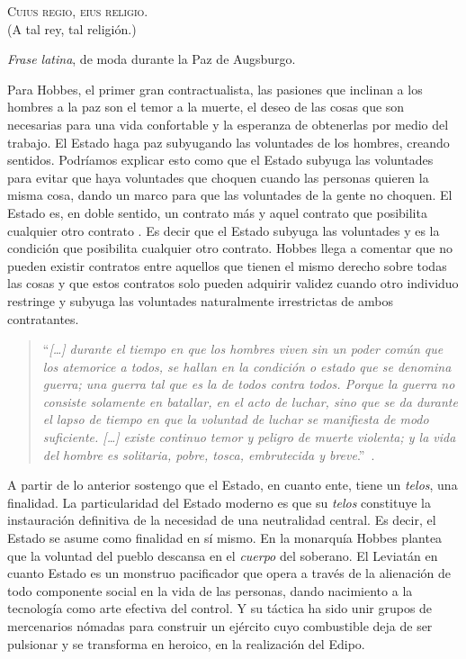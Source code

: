 \epigraph{\textsc{Cuius regio, eius religio}.\\ (\textsf{A tal rey, tal religión}.)}{\emph{Frase latina}, de moda durante la Paz de Augsburgo.}

Para Hobbes, el primer gran contractualista, las pasiones que inclinan a los hombres a la paz son el temor a la muerte, el deseo de las cosas que son necesarias para una vida confortable y la esperanza de obtenerlas por medio del trabajo. El Estado haga paz subyugando las voluntades de los hombres, creando sentidos. Podríamos explicar esto como que el Estado subyuga las voluntades para evitar que haya voluntades que choquen cuando las personas quieren la misma cosa, dando un marco para que las voluntades de la gente no choquen. El Estado es, en doble sentido, un contrato más y aquel contrato que posibilita cualquier otro contrato \autocite{hobbesLeviatan2007}. Es decir que el Estado subyuga las voluntades y es la condición que posibilita cualquier otro contrato. Hobbes llega a comentar que no pueden existir contratos entre aquellos que tienen el mismo derecho sobre todas las cosas \autocite{hobbesLeviatan2007} y que estos contratos solo pueden adquirir validez cuando otro individuo restringe y subyuga las voluntades naturalmente irrestrictas de ambos contratantes.

\begin{quote}
  \enquote{\emph{[\ldots] durante el tiempo en que los hombres viven sin un poder común que los atemorice a todos, se hallan en la condición o estado que se denomina guerra; una guerra tal que es la de todos contra todos. Porque la guerra no consiste solamente en batallar, en el acto de luchar, sino que se da durante el lapso de tiempo en que la voluntad de luchar se manifiesta de modo suficiente. [\ldots] existe continuo temor y peligro de muerte violenta; y la vida del hombre es solitaria, pobre, tosca, embrutecida y breve}.}~\autocite[Capítulo 13]{hobbesLeviatan2007}.
\end{quote}

A partir de lo anterior sostengo que el Estado, en cuanto ente, tiene un \emph{telos}, una finalidad. La particularidad del Estado moderno es que su \emph{telos} constituye la instauración definitiva de la necesidad de una neutralidad central. Es decir, el Estado se asume como finalidad en sí mismo. En la monarquía Hobbes plantea que la voluntad del pueblo descansa en el \emph{cuerpo} del soberano. El Leviatán en cuanto Estado es un monstruo pacificador que opera a través de la alienación de todo componente social en la vida de las personas, dando nacimiento a la tecnología como arte efectiva del control. Y su táctica ha sido unir grupos de mercenarios nómadas para construir un ejército cuyo combustible deja de ser pulsionar y se transforma en heroico, en la realización del Edipo.

